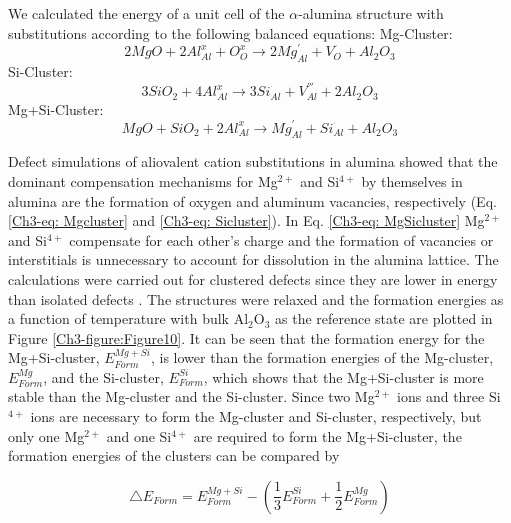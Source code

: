 We calculated the energy of a unit cell of the $\alpha$-alumina structure with substitutions according to the following balanced equations:\newline
\newline
\noindent Mg-Cluster: 
\begin{equation}
\label{Ch3-eq: Mgcluster}
2MgO + 2Al_{Al}^{x} + O_{O}^{x} \longrightarrow 2Mg_{Al}^{'} + V_{O}^{^{..}} + Al_{2}O_{3}
\end{equation}
\newline
\noindent Si-Cluster:
\begin{equation}
\label{Ch3-eq: Sicluster}
3SiO_{2} + 4Al_{Al}^{x} \longrightarrow 3Si_{Al}^{^{.}} + V_{Al}^{'''} + 2Al_{2}O_{3}
\end{equation}
\newline
\noindent Mg+Si-Cluster:
\begin{equation}
\label{Ch3-eq: MgSicluster}
MgO + SiO_{2} + 2Al_{Al}^{x} \longrightarrow Mg_{Al}^{'} + Si_{Al}^{^{.}} + Al_{2}O_{3}
\end{equation}


\noindent Defect simulations of aliovalent cation substitutions in alumina \cite{Atkinson2003} showed that the dominant compensation mechanisms for Mg$^{2+}$ and Si$^{4+}$ by themselves in alumina are the formation of oxygen and aluminum vacancies, respectively (Eq. \ref{Ch3-eq: Mgcluster} and \ref{Ch3-eq: Sicluster}). In Eq. \ref{Ch3-eq: MgSicluster} Mg$^{2+}$ and Si$^{4+}$ compensate for each other's charge and the formation of vacancies or interstitials is unnecessary to account for dissolution in the alumina lattice. The calculations were carried out for clustered defects since they are lower in energy than isolated defects \cite{Atkinson2003}. The structures were relaxed and the formation energies as a function of temperature with bulk Al$_{2}$O$_{3}$ as the reference state are plotted in Figure \ref{Ch3-figure:Figure10}. It can be seen that the formation energy for the Mg+Si-cluster, $E_{Form}^{Mg+Si}$, is lower than the formation energies of the Mg-cluster, $E_{Form}^{Mg}$, and the Si-cluster, $E_{Form}^{Si}$, which shows that the Mg+Si-cluster is more stable than the Mg-cluster and the Si-cluster. Since two Mg$^{2+}$ ions and three Si$^{4+}$ ions are necessary to form the Mg-cluster and Si-cluster, respectively, but only one Mg$^{2+}$ and one Si$^{4+}$ are required to form the Mg+Si-cluster, the formation energies of the clusters can be compared by 

\begin{equation}
\label{Ch3-eq: eform}
\bigtriangleup E_{Form}=E_{Form}^{Mg+Si} - \left( \frac{1}{3} E_{Form}^{Si} + \frac{1}{2}E_{Form}^{Mg} \right)
\end{equation}

